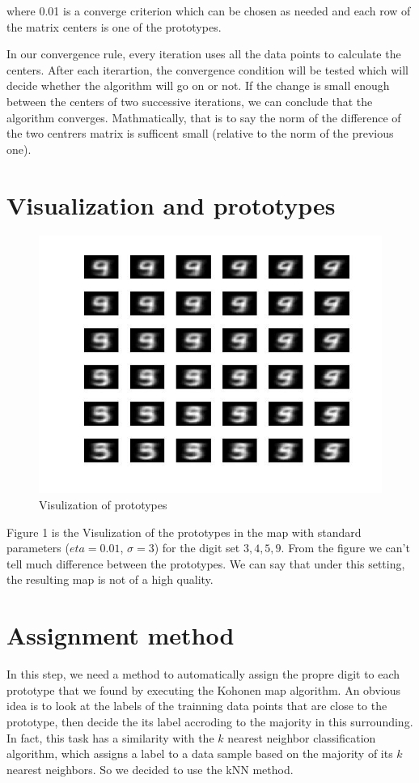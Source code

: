 \documentclass[a4paper, 12pt]{article}
\begin{document}
where 0.01 is a converge criterion which can be chosen as needed and each row of the matrix centers is one of the prototypes.

In our convergence rule, every iteration uses all the data points to
calculate the centers. After each iterartion, the convergence
condition will be tested which will decide whether the algorithm will
go on or not. If the change is small enough between the centers of two
successive iterations, we can conclude that the algorithm
converges. Mathmatically, that is to say the norm of the difference of the two centrers matrix is sufficent small (relative to the norm of the previous one).

\section{Visualization and prototypes}
\begin{figure}[h]
\centering
\includegraphics[scale=0.4]{../figure/sigma3eta001size6.jpg}
\caption{Visulization of prototypes}
\end{figure}

Figure 1 is the Visulization of the prototypes in the map with
standard parameters ($eta = 0.01$, $\sigma = 3$) for the digit set $3,
4, 5, 9$. From the figure we can't tell much difference between the
prototypes. We can say that under this setting, the resulting map is
not of a high quality.

\section{Assignment method}
In this step, we need a method to automatically assign the propre
digit to each prototype that we found by executing the Kohonen map
algorithm. An obvious idea is to look at the labels of the trainning
data points that are close to the prototype, then decide the its label
accroding to the majority in this surrounding. In fact, this task has
a similarity with the $k$ nearest neighbor classification algorithm,
which assigns a label to a data sample based on the majority of its $k$
nearest neighbors. So we decided to use the kNN method.
\end{document}
